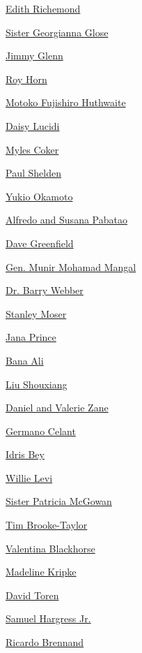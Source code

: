 \protect\hyperlink{edith-richemond}{Edith Richemond}

\protect\hyperlink{sister-georgianna-glose}{Sister Georgianna Glose}

\protect\hyperlink{jimmy-glenn}{Jimmy Glenn}

\protect\hyperlink{roy-horn}{Roy Horn}

\protect\hyperlink{motoko-fujishiro-huthwaite}{Motoko Fujishiro
Huthwaite}

\protect\hyperlink{daisy-lucidi}{Daisy Lucidi}

\protect\hyperlink{myles-coker}{Myles Coker}

\protect\hyperlink{paul-shelden}{Paul Shelden}

\protect\hyperlink{yukio-okamoto}{Yukio Okamoto}

\protect\hyperlink{alfredo-and-susana-pabatao}{Alfredo and Susana
Pabatao}

\protect\hyperlink{dave-greenfield}{Dave Greenfield}

\protect\hyperlink{gen-munir-mohamad-mangal}{Gen. Munir Mohamad Mangal}

\protect\hyperlink{dr-barry-webber-}{Dr. Barry Webber}

\protect\hyperlink{stanley-moser}{Stanley Moser}

\protect\hyperlink{jana-prince}{Jana Prince}

\protect\hyperlink{bana-ali}{Bana Ali}

\protect\hyperlink{liu-shouxiang}{Liu Shouxiang}

\protect\hyperlink{daniel-and-valerie-zane}{Daniel and Valerie Zane}

\protect\hyperlink{germano-celant}{Germano Celant}

\protect\hyperlink{idris-bey}{Idris Bey}

\protect\hyperlink{willie-levi}{Willie Levi}

\protect\hyperlink{sister-patricia-mcgowan}{Sister Patricia McGowan}

\protect\hyperlink{tim-brooketaylor}{Tim Brooke-Taylor}

\protect\hyperlink{valentina-blackhorse}{Valentina Blackhorse}

\protect\hyperlink{madeline-kripke}{Madeline Kripke}

\protect\hyperlink{david-toren}{David Toren}

\protect\hyperlink{samuel-hargress-jr}{Samuel Hargress Jr.}

\protect\hyperlink{ricardo-brennand}{Ricardo Brennand}

